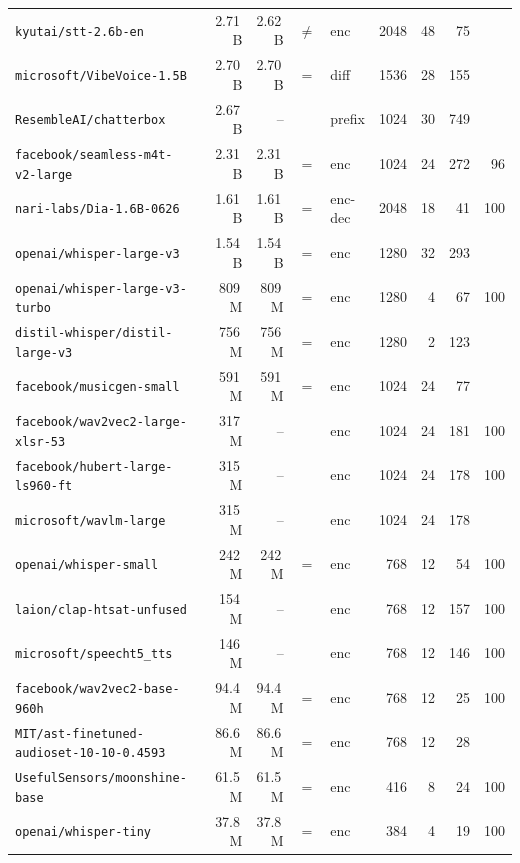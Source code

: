 \begin{longtable}{@{}llrrclrrrr@{}}
{\tiny\texttt{kyutai/stt-2.6b-en}} &  & 2.71\,B & 2.62\,B & $\ne$ & enc & 2048 & 48 & 75 &  \\
{\tiny\texttt{microsoft/VibeVoice-1.5B}} &  & 2.70\,B & 2.70\,B & = & diff & 1536 & 28 & 155 &  \\
{\tiny\texttt{ResembleAI/chatterbox}} &  & 2.67\,B & -- &  & prefix & 1024 & 30 & 749 &  \\
{\tiny\texttt{facebook/seamless-m4t-v2-large}} &  & 2.31\,B & 2.31\,B & = & enc & 1024 & 24 & 272 & 96 \\
{\tiny\texttt{nari-labs/Dia-1.6B-0626}} &  & 1.61\,B & 1.61\,B & = & enc-dec & 2048 & 18 & 41 & 100 \\
{\tiny\texttt{openai/whisper-large-v3}} &  & 1.54\,B & 1.54\,B & = & enc & 1280 & 32 & 293 &  \\
{\tiny\texttt{openai/whisper-large-v3-turbo}} &  & 809\,M & 809\,M & = & enc & 1280 & 4 & 67 & 100 \\
{\tiny\texttt{distil-whisper/distil-large-v3}} &  & 756\,M & 756\,M & = & enc & 1280 & 2 & 123 &  \\
{\tiny\texttt{facebook/musicgen-small}} &  & 591\,M & 591\,M & = & enc & 1024 & 24 & 77 &  \\
{\tiny\texttt{facebook/wav2vec2-large-xlsr-53}} &  & 317\,M & -- &  & enc & 1024 & 24 & 181 & 100 \\
{\tiny\texttt{facebook/hubert-large-ls960-ft}} &  & 315\,M & -- &  & enc & 1024 & 24 & 178 & 100 \\
{\tiny\texttt{microsoft/wavlm-large}} &  & 315\,M & -- &  & enc & 1024 & 24 & 178 &  \\
{\tiny\texttt{openai/whisper-small}} &  & 242\,M & 242\,M & = & enc & 768 & 12 & 54 & 100 \\
{\tiny\texttt{laion/clap-htsat-unfused}} &  & 154\,M & -- &  & enc & 768 & 12 & 157 & 100 \\
{\tiny\texttt{microsoft/speecht5\_tts}} &  & 146\,M & -- &  & enc & 768 & 12 & 146 & 100 \\
{\tiny\texttt{facebook/wav2vec2-base-960h}} &  & 94.4\,M & 94.4\,M & = & enc & 768 & 12 & 25 & 100 \\
{\tiny\texttt{MIT/ast-finetuned-audioset-10-10-0.4593}} &  & 86.6\,M & 86.6\,M & = & enc & 768 & 12 & 28 &  \\
{\tiny\texttt{UsefulSensors/moonshine-base}} &  & 61.5\,M & 61.5\,M & = & enc & 416 & 8 & 24 & 100 \\
{\tiny\texttt{openai/whisper-tiny}} &  & 37.8\,M & 37.8\,M & = & enc & 384 & 4 & 19 & 100 \\

\end{longtable}
